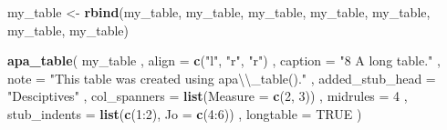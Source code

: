 \documentclass[english,man]{apa6}
\newenvironment{Shaded}{\begin{snugshade}}{\end{snugshade}}
\newcommand{\KeywordTok}[1]{\textcolor[rgb]{0.13,0.29,0.53}{\textbf{{#1}}}}
\newcommand{\DataTypeTok}[1]{\textcolor[rgb]{0.13,0.29,0.53}{{#1}}}
\newcommand{\DecValTok}[1]{\textcolor[rgb]{0.00,0.00,0.81}{{#1}}}
\newcommand{\CharTok}[1]{\textcolor[rgb]{0.31,0.60,0.02}{{#1}}}
\newcommand{\StringTok}[1]{\textcolor[rgb]{0.31,0.60,0.02}{{#1}}}
\newcommand{\OtherTok}[1]{\textcolor[rgb]{0.56,0.35,0.01}{{#1}}}
\newcommand{\NormalTok}[1]{{#1}}
\begin{document}
\begin{Shaded}
\begin{Highlighting}[]
\NormalTok{my_table <-}\StringTok{ }\KeywordTok{rbind}\NormalTok{(my_table, my_table, my_table, my_table, my_table, my_table, my_table)}

\KeywordTok{apa_table}\NormalTok{(}
  \NormalTok{my_table}
  \NormalTok{, }\DataTypeTok{align =} \KeywordTok{c}\NormalTok{(}\StringTok{"l"}\NormalTok{, }\StringTok{"r"}\NormalTok{, }\StringTok{"r"}\NormalTok{)}
  \NormalTok{, }\DataTypeTok{caption =} \StringTok{"8 A long table."}
  \NormalTok{, }\DataTypeTok{note =} \StringTok{"This table was created using apa}\CharTok{\textbackslash{}\textbackslash{}}\StringTok{_table()."}
  \NormalTok{, }\DataTypeTok{added_stub_head =} \StringTok{"Desciptives"}
  \NormalTok{, }\DataTypeTok{col_spanners =} \KeywordTok{list}\NormalTok{(}\DataTypeTok{Measure =} \KeywordTok{c}\NormalTok{(}\DecValTok{2}\NormalTok{, }\DecValTok{3}\NormalTok{))}
  \NormalTok{, }\DataTypeTok{midrules =} \DecValTok{4}
  \NormalTok{, }\DataTypeTok{stub_indents =} \KeywordTok{list}\NormalTok{(}\KeywordTok{c}\NormalTok{(}\DecValTok{1}\NormalTok{:}\DecValTok{2}\NormalTok{), }\DataTypeTok{Jo =} \KeywordTok{c}\NormalTok{(}\DecValTok{4}\NormalTok{:}\DecValTok{6}\NormalTok{))}
  \NormalTok{, }\DataTypeTok{longtable =} \OtherTok{TRUE}
\NormalTok{)}
\end{Highlighting}
\end{Shaded}
\end{document}
